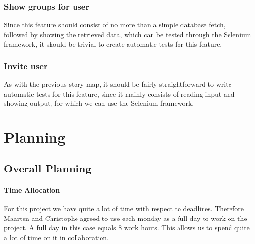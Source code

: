 \documentclass[10pt,a4paper,BCOR12mm, headexclude, footexclude,
  twoside, openright]{scrartcl}
\numberwithin{equation}{section} %
\numberwithin{figure}{section} %
\numberwithin{table}{section} %
\begin{document}
\subsubsection*{Show groups for user}
Since this feature should consist of no more than a simple database fetch,
followed by showing the retrieved data, which can be tested through the Selenium
framework, it should be trivial to create automatic tests for this feature.

\subsubsection*{Invite user}
As with the previous story map, it should be fairly straightforward to write
automatic tests for this feature, since it mainly consists of reading input and
showing output, for which we can use the Selenium framework.


\newpage
\section{Planning}
\subsection{Overall Planning}
\paragraph{Time Allocation}
For this project we have quite a lot of time with respect to
deadlines. Therefore Maarten and Christophe agreed to use each monday as a full
day to work on the project. A full day in this case equals 8 work hours. This
allows us to spend quite a lot of time on it in collaboration.
\end{document}
